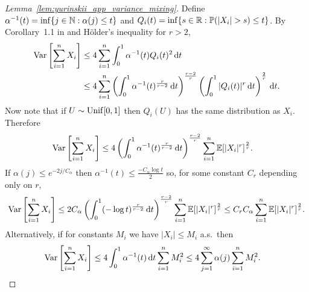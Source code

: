 \begin{proof}[Lemma~\ref{lem:yurinskii_app_variance_mixing}]

  Define
  $\alpha^{-1}(t) =
  \inf\{j \in \mathbb{N} : \alpha(j) \leq t\}$
  and $Q_i(t) = \inf\{s \in \mathbb{R} : \mathbb{P}(|X_i| > s) \leq t\}$.
  By Corollary~1.1 in \citet{rio2017asymptotic}
  and H{\"o}lder's inequality for $r > 2$,
  \begin{align*}
    \operatorname{Var}\left[
      \sum_{i=1}^n X_i
    \right]
    &\leq
    4 \sum_{i=1}^n
    \int_0^1 \alpha^{-1}(t)
    Q_i(t)^2 \,\mathrm{d}t \\
    &\leq
    4 \sum_{i=1}^n
    \left(
      \int_0^1 \alpha^{-1}(t)^{\frac{r}{r-2}} \,\mathrm{d}t
    \right)^{\frac{r-2}{r}}
    \left(
      \int_0^1 |Q_i(t)|^r \,\mathrm{d}t
    \right)^{\frac{2}{r}}
    \,\mathrm{d}t.
  \end{align*}
  Now note that if $U \sim \operatorname{Unif}[0,1]$ then
  $Q_i(U)$ has the same distribution as $X_i$.
  Therefore
  \begin{align*}
    \operatorname{Var}\left[
      \sum_{i=1}^n X_i
    \right]
    &\leq
    4
    \left(
      \int_0^1 \alpha^{-1}(t)^{\frac r{r-2}} \,\mathrm{d}t
    \right)^{\frac{r-2}r}
    \sum_{i=1}^n
    \mathbb{E}[|X_i|^r]^{\frac 2 r}.
  \end{align*}
  If $\alpha(j) \leq e^{-2j/C_\alpha}$ then
  $\alpha^{-1}(t) \leq \frac{-C_\alpha \log t}{2}$
  so, for some constant
  $C_r$ depending only on $r$,
  \begin{align*}
    \operatorname{Var}\left[
      \sum_{i=1}^n X_i
    \right]
    \leq
    2 C_\alpha
    \left(
      \int_0^1 (-\log t)^{\frac r{r-2}} \,\mathrm{d}t
    \right)^{\frac{r-2} r}
    \sum_{i=1}^n
    \mathbb{E}[|X_i|^r]^{\frac 2 r}
    \leq
    C_r C_\alpha
    \sum_{i=1}^n
    \mathbb{E}[|X_i|^r]^{\frac 2 r}.
  \end{align*}
  Alternatively, if for constants $M_i$ we have
  $|X_i| \leq M_i$ a.s.\ then
  \begin{align*}
    \operatorname{Var}\left[
      \sum_{i=1}^n X_i
    \right]
    &\leq
    4 \int_0^1 \alpha^{-1}(t)
    \,\mathrm{d}t
    \sum_{i=1}^n M_i^2
    \leq
    4 \sum_{j=1}^\infty \alpha(j)
    \sum_{i=1}^n M_i^2.
  \end{align*}
\end{proof}

